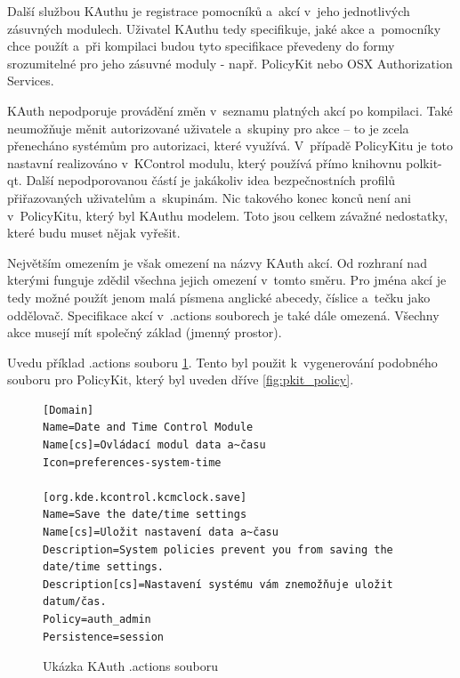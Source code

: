 Další službou KAuthu je registrace pomocníků a~akcí v~jeho jednotlivých
zásuvných modulech. Uživatel KAuthu tedy specifikuje, jaké akce a~pomocníky chce
použít a~při kompilaci budou tyto specifikace převedeny do formy srozumitelné
pro jeho zásuvné moduly - např. PolicyKit nebo OSX Authorization Services.

KAuth nepodporuje provádění změn v~seznamu platných akcí po kompilaci. Také
neumožňuje měnit autorizované uživatele a~skupiny pro akce -- to je zcela
přenecháno systémům pro autorizaci, které využívá. V~případě PolicyKitu je
toto nastavní realizováno v~KControl modulu, který používá přímo knihovnu
polkit-qt. Další nepodporovanou částí je jakákoliv idea bezpečnostních profilů
přiřazovaných uživatelům a~skupinám. Nic takového konec konců není ani
v~PolicyKitu, který byl KAuthu modelem. Toto jsou celkem závažné nedostatky,
které budu muset nějak vyřešit.

Největším omezením je však omezení na názvy KAuth akcí. Od rozhraní nad kterými
funguje zdědil všechna jejich omezení v~tomto směru. Pro jména akcí je tedy
možné použít jenom malá písmena anglické abecedy, číslice a~tečku jako
oddělovač. Specifikace akcí v~.actions souborech je také dále omezená. Všechny
akce musejí mít společný základ (jmenný prostor).

Uvedu příklad .actions souboru \ref{fig:kauth_dotactions}. Tento byl použit
k~vygenerování podobného souboru pro PolicyKit, který byl uveden dříve
\ref{fig:pkit_policy}.

\begin{figure}[h]
    \centering
    \begin{verbatim}
[Domain]
Name=Date and Time Control Module
Name[cs]=Ovládací modul data a~času
Icon=preferences-system-time

[org.kde.kcontrol.kcmclock.save]
Name=Save the date/time settings
Name[cs]=Uložit nastavení data a~času
Description=System policies prevent you from saving the date/time settings.
Description[cs]=Nastavení systému vám znemožňuje uložit datum/čas.
Policy=auth_admin
Persistence=session
    \end{verbatim}
    \caption{Ukázka KAuth .actions souboru}
    \label{fig:kauth_dotactions}
\end{figure}

% 

